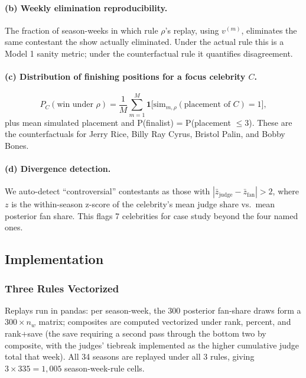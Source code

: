 \documentclass{article}
\begin{document}
\paragraph{(b) Weekly elimination reproducibility.} The fraction of season-weeks in which rule $\rho$'s replay, using $v^{(m)}$, eliminates the same contestant the show actually eliminated. Under the actual rule this is a Model 1 sanity metric; under the counterfactual rule it quantifies disagreement.

\paragraph{(c) Distribution of finishing positions for a focus celebrity $C$.}
\begin{equation}
P_C(\text{win under } \rho) = \frac{1}{M}\sum_{m=1}^M \mathbf{1}\big[\text{sim}_{m,\rho}(\text{placement of } C) = 1\big],
\label{eq:pwin}
\end{equation}
plus mean simulated placement and P(finalist) = P(placement $\le 3$). These are the counterfactuals for Jerry Rice, Billy Ray Cyrus, Bristol Palin, and Bobby Bones.

\paragraph{(d) Divergence detection.} We auto-detect ``controversial'' contestants as those with $|\bar z_{\text{judge}} - \bar z_{\text{fan}}| > 2$, where $z$ is the within-season z-score of the celebrity's mean judge share vs.\ mean posterior fan share. This flags 7 celebrities for case study beyond the four named ones.

\subsection{Implementation}

\subsubsection{Three Rules Vectorized}

Replays run in pandas: per season-week, the 300 posterior fan-share draws form a $300 \times n_w$ matrix; composites are computed vectorized under rank, percent, and rank+save (the save requiring a second pass through the bottom two by composite, with the judges' tiebreak implemented as the higher cumulative judge total that week). All 34 seasons are replayed under all 3 rules, giving $3 \times 335 = 1{,}005$ season-week-rule cells.
\end{document}
